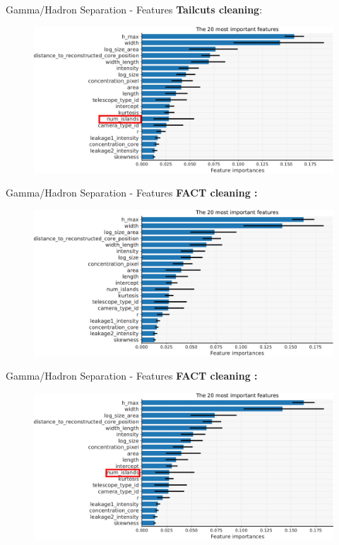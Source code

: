 \begin{frame}[noframenumbering]{Gamma/Hadron Separation - Features}
	\textbf{Tailcuts cleaning}:
	\begin{figure}
	    \centering
	    \includegraphics[width=0.8\linewidth]{images/result_plots/tail1/sep_diff_4-crop2.png}
	\end{figure}
\end{frame}

\begin{frame}{Gamma/Hadron Separation - Features}
	\textbf{FACT cleaning :}
	\begin{figure}
            \centering
            \includegraphics[width=0.8\linewidth]{images/result_plots/fact2/sep_diff_4-crop.pdf}
        \end{figure}
\end{frame}

\begin{frame}[noframenumbering]{Gamma/Hadron Separation - Features}
	\textbf{FACT cleaning :}
	\begin{figure}
            \centering
            \includegraphics[width=0.8\linewidth]{images/result_plots/fact2/sep_diff_4-crop2.png}
        \end{figure}
\end{frame}


